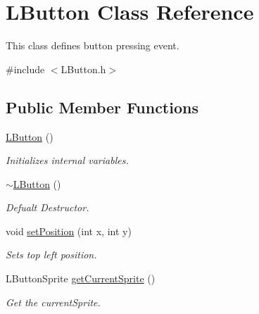 \hypertarget{class_l_button}{}\section{L\+Button Class Reference}
\label{class_l_button}


This class defines button pressing event.  




{\ttfamily \#include $<$L\+Button.\+h$>$}

\subsection*{Public Member Functions}
\begin{DoxyCompactItemize}
\item 
\mbox{\label{class_l_button_a0de0fa6527e5647aa041e8cad426a8be}} 
\mbox{\hyperlink{class_l_button_a0de0fa6527e5647aa041e8cad426a8be}{L\+Button}} ()
\begin{DoxyCompactList}\small\item\em Initializes internal variables. \end{DoxyCompactList}\item 
\mbox{\label{class_l_button_a582229b38709fd5f98aec6de488d8ecf}} 
\mbox{\hyperlink{class_l_button_a582229b38709fd5f98aec6de488d8ecf}{$\sim$\+L\+Button}} ()
\begin{DoxyCompactList}\small\item\em Defualt Destructor. \end{DoxyCompactList}\item 
\mbox{\label{class_l_button_adf374214d3d7b52d59072431917fb7da}} 
void \mbox{\hyperlink{class_l_button_adf374214d3d7b52d59072431917fb7da}{set\+Position}} (int x, int y)
\begin{DoxyCompactList}\small\item\em Sets top left position. \end{DoxyCompactList}\item 
\mbox{\label{class_l_button_af0ed059c15c624b75a47d6242becb0cf}} 
L\+Button\+Sprite \mbox{\hyperlink{class_l_button_af0ed059c15c624b75a47d6242becb0cf}{get\+Current\+Sprite}} ()
\begin{DoxyCompactList}\small\item\em Get the current\+Sprite. \end{DoxyCompactList}\item 

\end{DoxyCompactItemize}
